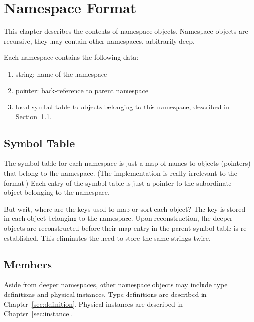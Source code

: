 
\chapter{Namespace Format}
\label{sec:namespace}

This chapter describes the contents of namespace objects.  
Namespace objects are recursive, they may contain other namespaces, 
arbitrarily deep.  

Each namespace contains the following data:

\begin{enumerate}
\item string: name of the namespace
\item pointer: back-reference to parent namespace
\item local symbol table to objects belonging to this namespace, 
	described in Section~\ref{sec:namespace:table}.  
\end{enumerate}

\section{Symbol Table}
\label{sec:namespace:table}

The symbol table for each namespace is just a map of names to
objects (pointers) that belong to the namespace.  
(The implementation is really irrelevant to the format.)
Each entry of the symbol table is just a pointer to the 
subordinate object belonging to the namespace.  

But wait, where are the keys used to map or sort each object?
The key is stored in each object belonging to the namespace.  
Upon reconstruction, the deeper objects are reconstructed 
before their map entry in the parent symbol table is re-established.  
This eliminates the need to store the same strings twice.  

\section{Members}
\label{sec:namespace:members}

Aside from deeper namespaces, other namespace objects may include
type definitions and physical instances.  
Type definitions are described in Chapter~\ref{sec:definition}.
Physical instances are described in Chapter~\ref{sec:instance}.

